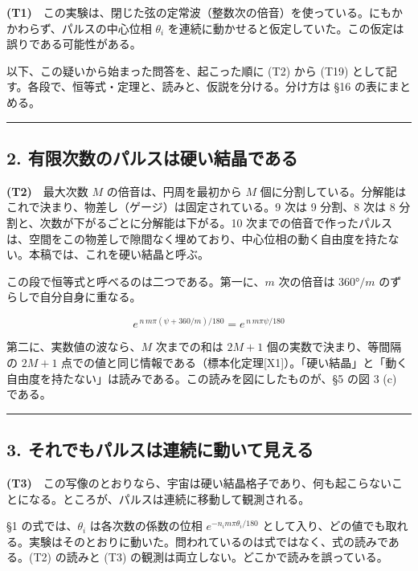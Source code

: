 \documentclass[
  a4paper,
]{ltjsarticle}
\begin{document}
\textbf{(T1)}　この実験は、閉じた弦の定常波（整数次の倍音）を使っている。にもかかわらず、パルスの中心位相
\(\theta_i\)
を連続に動かせると仮定していた。この仮定は誤りである可能性がある。

以下、この疑いから始まった問答を、起こった順に (T2) から (T19)
として記す。各段で、恒等式・定理と、読みと、仮説を分ける。分け方は §16
の表にまとめる。

\begin{center}\rule{0.5\linewidth}{0.5pt}\end{center}

\subsection{2.
有限次数のパルスは硬い結晶である}\label{ux6709ux9650ux6b21ux6570ux306eux30d1ux30ebux30b9ux306fux786cux3044ux7d50ux6676ux3067ux3042ux308b}

\textbf{(T2)}　最大次数 \(M\) の倍音は、円周を最初から \(M\)
個に分割している。分解能はこれで決まり、物差し（ゲージ）は固定されている。9
次は 9 分割、8 次は 8 分割と、次数が下がるごとに分解能は下がる。10
次までの倍音で作ったパルスは、空間をこの物差しで隙間なく埋めており、中心位相の動く自由度を持たない。本稿では、これを硬い結晶と呼ぶ。

この段で恒等式と呼べるのは二つである。第一に、\(m\) 次の倍音は
\(360°/m\) のずらしで自分自身に重なる。

\[
e^{\,n\,m\pi(\psi+360/m)/180}=e^{\,n\,m\pi\psi/180}
\]

第二に、実数値の波なら、\(M\) 次までの和は \(2M+1\)
個の実数で決まり、等間隔の \(2M+1\)
点での値と同じ情報である（標本化定理{[}X1{]}）。「硬い結晶」と「動く自由度を持たない」は読みである。この読みを図にしたものが、§5
の図 3 (c) である。

\begin{center}\rule{0.5\linewidth}{0.5pt}\end{center}

\subsection{3.
それでもパルスは連続に動いて見える}\label{ux305dux308cux3067ux3082ux30d1ux30ebux30b9ux306fux9023ux7d9aux306bux52d5ux3044ux3066ux898bux3048ux308b}

\textbf{(T3)}　この写像のとおりなら、宇宙は硬い結晶格子であり、何も起こらないことになる。ところが、パルスは連続に移動して観測される。

§1 の式では、\(\theta_i\) は各次数の係数の位相
\(e^{-n_i m\pi\theta_i/180}\)
として入り、どの値でも取れる。実験はそのとおりに動いた。問われているのは式ではなく、式の読みである。(T2)
の読みと (T3) の観測は両立しない。どこかで読みを誤っている。
\end{document}
